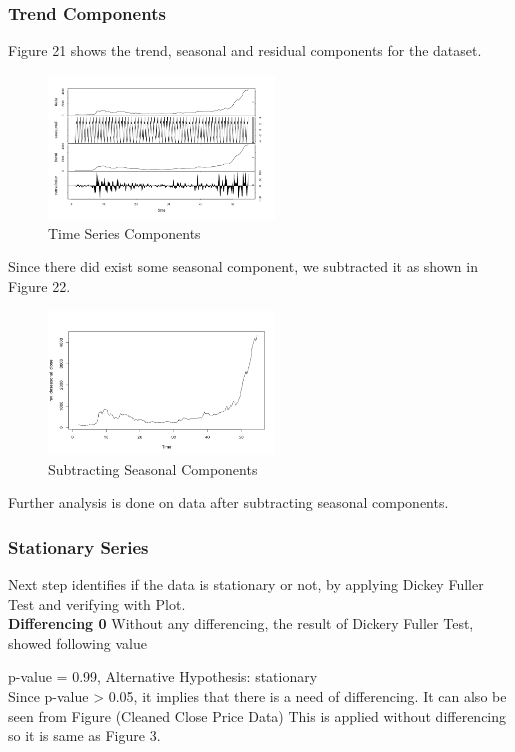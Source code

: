 \documentclass{article}
\begin{document}
\subsubsection{Trend Components}
Figure 21 shows the trend, seasonal and residual components for the dataset.

\begin{figure}[ht]
	\centering
	\includegraphics[width = 6cm]{TimeSeriesComponents.png}
	\caption{Time Series Components}
	\label{fig:Time Series Components}
\end{figure}

Since there did exist some seasonal component, we subtracted it as shown in Figure 22.


\begin{figure}[ht]
	\centering
	\includegraphics[width = 6cm]{SubtractingSeasonal.png}
	\caption{Subtracting Seasonal Components}
	\label{fig:Subtracting Seasonal Components}
\end{figure}

Further analysis is done on data after subtracting seasonal components.
\newpage
\subsubsection{Stationary Series}

Next step identifies if the data is stationary or not, by applying Dickey Fuller Test and verifying with Plot.
\\ \textbf{Differencing 0}
Without any differencing, the result of Dickery Fuller Test, showed following value

p-value = 0.99, Alternative Hypothesis: stationary
 \\ Since p-value > 0.05, it implies that there is a need of differencing. It can also be seen from Figure (Cleaned Close Price Data)
This is applied without differencing so it is same as Figure 3.
\end{document}
